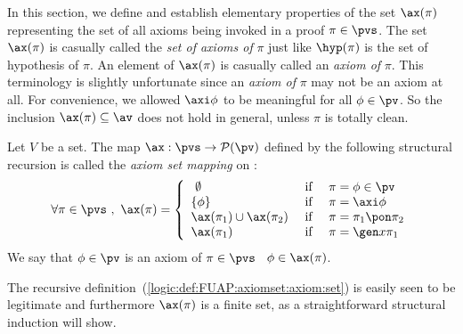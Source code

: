 In this section, we define and establish elementary properties of
the set $\ax(\pi)$ representing the set of all axioms being invoked
in a proof $\pi\in\pvs$. The set $\ax(\pi)$ is casually called the
{\em set of axioms of} $\pi$ just like $\hyp(\pi)$ is the set of
hypothesis of $\pi$. An element of $\ax(\pi)$ is casually called an
{\em axiom of} $\pi$. This terminology is slightly unfortunate since
an {\em axiom of} $\pi$ may not be an axiom at all. For convenience,
we allowed $\axi\phi$ to be meaningful for all $\phi\in\pv$. So the
inclusion $\ax(\pi)\subseteq\av$ does not hold in general, unless
$\pi$ is totally clean. 
\begin{defin}\label{logic:def:FUAP:axiomset:axiom:set}
Let $V$ be a set. The map $\ax:\pvs\to{\cal P}(\pv)$ defined by the
following structural recursion is called the {\em axiom set mapping}
on \pvs:
 \begin{equation}\label{logic:eqn:FUAP:axiomset:recursion}
    \forall\pi\in\pvs\ ,\ \ax(\pi)=\left\{
                    \begin{array}{lcl}
                    \ \emptyset&\mbox{\ if\ }&\pi=\phi\in\pv\\
                    \{\phi\}&\mbox{\ if\ }&\pi=\axi\phi\\
                    \ax(\pi_{1})\cup\ax(\pi_{2}) &\mbox{\ if\ }&\pi=\pi_{1}\pon\pi_{2}\\
                    \ax(\pi_{1})&\mbox{\ if\ }&\pi=\gen x\pi_{1}\\
                    \end{array}\right.
    \end{equation}
We say that $\phi\in\pv$ is an axiom of $\pi\in\pvs$ \ifand\
$\phi\in\ax(\pi)$.
\end{defin}
The recursive definition~(\ref{logic:def:FUAP:axiomset:axiom:set})
is easily seen to be legitimate and furthermore $\ax(\pi)$ is a
finite set, as a straightforward structural induction will show.

